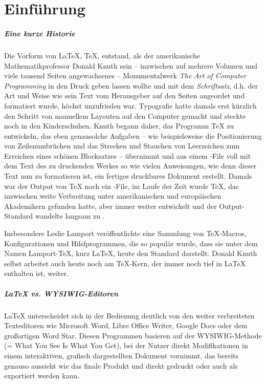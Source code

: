 \chapter{Einführung}

\paragraph{Eine kurze Historie}
Die Vorform von \LaTeX{}, \TeX{}, entstand, als der amerikanische Mathematikprofessor Donald Knuth sein -- inzwischen auf mehrere Volumen und viele tausend Seiten angewachsenes -- Monumentalwerk \emph{The Art of Computer Programming} in den Druck geben lassen wollte und mit dem \emph{Schriftsatz}, d.h. der Art und Weise wie sein Text vom Herausgeber auf den Seiten angeordet und formatiert wurde, höchst unzufrieden war.
Typografie hatte damals erst kürzlich den Schritt von manuellem Layouten auf den Computer gemacht und steckte noch in den Kinderschuhen.
Knuth begann daher, das Programm \TeX{} zu entwickeln, das eben genausolche Aufgaben -- wie beispielsweise die Positionierung von Zeilenumbrüchen und das Strecken und Stauchen von Leerzeichen zum Erreichen eines schönen Blocksatzes -- übernimmt und aus einem -File voll mit dem Text des zu druckenden Werkes so wie vielen Anweisungen, wie denn dieser Text nun zu formatieren ist, ein fertiges druckbares Dokument erstellt.
Damals war der Output von \TeX{} noch ein -File, im Laufe der Zeit wurde \TeX{}, das inzwischen weite Verbreitung unter amerikanischen und europäischen Akademikern gefunden hatte, aber immer weiter entwickelt und der Output-Standard wandelte langsam zu .

Insbesondere Leslie Lamport veröffentlichte eine Sammlung von \TeX{}-Macros, Konfigurationen und Hilsfprogrammen, die so populär wurde, dass sie unter dem Namen Lamport-\TeX{}, kurz \LaTeX{}, heute den Standard darstellt.
Donald Knuth selbst arbeitet auch heute noch am \TeX{}-Kern, der immer noch tief in \LaTeX{} enthalten ist, weiter.

\paragraph{\LaTeX{} vs. WYSIWIG-Editoren}
\LaTeX{} unterscheidet sich in der Bedienung deutlich von den weiter verbreiteten Texteditoren wie Microsoft Word, Libre Office Writer, Google Docs oder dem großartigen Word Star.
Diesen Programmen basieren auf der WYSIWIG-Methode (= What You See Is What You Get), bei der Nutzer direkt Modifikationen in einem interaktiven, grafisch dargestellten Dokument vornimmt, das bereits genauso aussieht wie das finale Produkt und direkt gedruckt oder auch als  exportiert werden kann.

